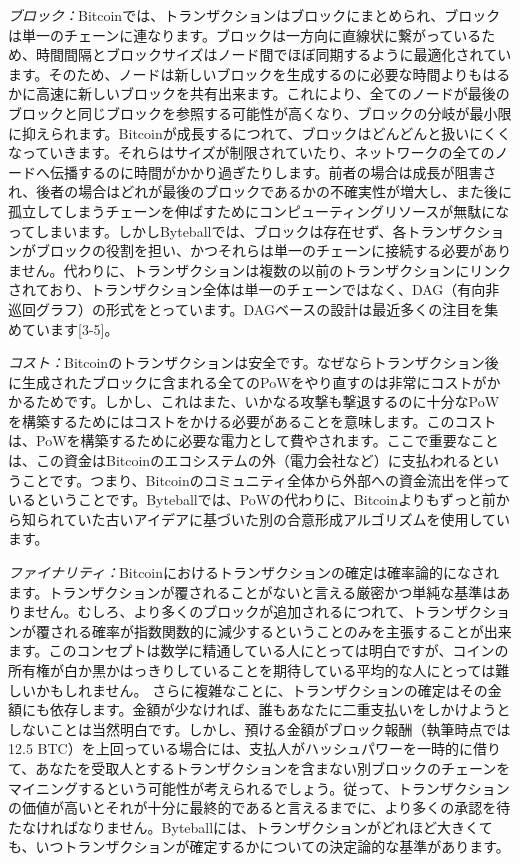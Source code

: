 \documentclass[a4paper, dvipdfmx]{jsarticle}
\begin{document}
\emph{ブロック：}Bitcoinでは、トランザクションはブロックにまとめられ、ブロックは単一のチェーンに連なります。ブロックは一方向に直線状に繋がっているため、時間間隔とブロックサイズはノード間でほぼ同期するように最適化されています。そのため、ノードは新しいブロックを生成するのに必要な時間よりもはるかに高速に新しいブロックを共有出来ます。これにより、全てのノードが最後のブロックと同じブロックを参照する可能性が高くなり、ブロックの分岐が最小限に抑えられます。Bitcoinが成長するにつれて、ブロックはどんどんと扱いにくくなっていきます。それらはサイズが制限されていたり、ネットワークの全てのノードへ伝播するのに時間がかかり過ぎたりします。前者の場合は成長が阻害され、後者の場合はどれが最後のブロックであるかの不確実性が増大し、また後に孤立してしまうチェーンを伸ばすためにコンピューティングリソースが無駄になってしまいます。しかしByteballでは、ブロックは存在せず、各トランザクションがブロックの役割を担い、かつそれらは単一のチェーンに接続する必要がありません。代わりに、トランザクションは複数の以前のトランザクションにリンクされており、トランザクション全体は単一のチェーンではなく、DAG（有向非巡回グラフ）の形式をとっています。DAGベースの設計は最近多くの注目を集めています[3-5]。

\emph{コスト：}Bitcoinのトランザクションは安全です。なぜならトランザクション後に生成されたブロックに含まれる全てのPoWをやり直すのは非常にコストがかかるためです。しかし、これはまた、いかなる攻撃も撃退するのに十分なPoWを構築するためにはコストをかける必要があることを意味します。このコストは、PoWを構築するために必要な電力として費やされます。ここで重要なことは、この資金はBitcoinのエコシステムの外（電力会社など）に支払われるということです。つまり、Bitcoinのコミュニティ全体から外部への資金流出を伴っているということです。Byteballでは、PoWの代わりに、Bitcoinよりもずっと前から知られていた古いアイデアに基づいた別の合意形成アルゴリズムを使用しています。

\emph{ファイナリティ：}Bitcoinにおけるトランザクションの確定は確率論的になされます。トランザクションが覆されることがないと言える厳密かつ単純な基準はありません。むしろ、より多くのブロックが追加されるにつれて、トランザクションが覆される確率が指数関数的に減少するということのみを主張することが出来ます。このコンセプトは数学に精通している人にとっては明白ですが、コインの所有権が白か黒かはっきりしていることを期待している平均的な人にとっては難しいかもしれません。 さらに複雑なことに、トランザクションの確定はその金額にも依存します。金額が少なければ、誰もあなたに二重支払いをしかけようとしないことは当然明白です。しかし、預ける金額がブロック報酬（執筆時点では12.5 BTC）を上回っている場合には、支払人がハッシュパワーを一時的に借りて、あなたを受取人とするトランザクションを含まない別ブロックのチェーンをマイニングするという可能性が考えられるでしょう。従って、トランザクションの価値が高いとそれが十分に最終的であると言えるまでに、より多くの承認を待たなければなりません。Byteballには、トランザクションがどれほど大きくても、いつトランザクションが確定するかについての決定論的な基準があります。
\end{document}
